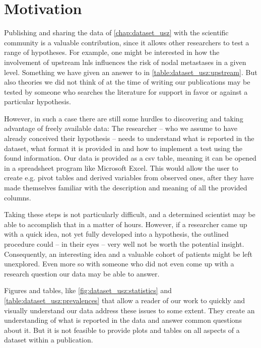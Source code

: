 \documentclass[\relativeRoot/main.tex]{subfiles}
\begin{document}
\section{Motivation}
\label{sec:lyprox:motivation}

Publishing and sharing the data of \cref{chap:dataset_usz} with the scientific community is a valuable contribution, since it allows other researchers to test a range of hypotheses. For example, one might be interested in how the involvement of upstream \glspl{lnl} influences the risk of nodal metastases in a given level. Something we have given an answer to in \cref{table:dataset_usz:upstream}. But also theories we did not think of at the time of writing our publications \cite{ludwig_detailed_2021,ludwig_dataset_2021} may be tested by someone who searches the literature for support in favor or against a particular hypothesis.

However, in such a case there are still some hurdles to discovering and taking advantage of freely available data: The researcher -- who we assume to have already conceived their hypothesis -- needs to understand what is reported in the dataset, what format it is provided in and how to implement a test using the found information. Our data is provided as a \gls{csv} table, meaning it can be opened in a spreadsheet program like Microsoft Excel. This would allow the user to create e.g. pivot tables and derived variables from observed ones, after they have made themselves familiar with the description and meaning of all the provided columns.

Taking these steps is not particularly difficult, and a determined scientist may be able to accomplish that in a matter of hours. However, if a researcher came up with a quick idea, not yet fully developed into a hypothesis, the outlined procedure could -- in their eyes -- very well not be worth the potential insight. Consequently, an interesting idea and a valuable cohort of patients might be left unexplored. Even more so with someone who did not even come up with a research question our data may be able to answer.

Figures and tables, like \cref{fig:dataset_usz:statistics} and \cref{table:dataset_usz:prevalences} that allow a reader of our work to quickly and visually understand our data address these issues to some extent. They create an understanding of what is reported in the data and answer common questions about it. But it is not feasible to provide plots and tables on all aspects of a dataset within a publication.
\end{document}
